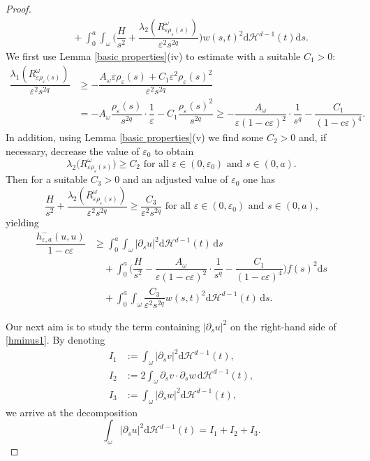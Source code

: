 \documentclass[10pt,a4paper]{amsart}
\newcommand{\dd}{\mathrm{d}}
\newcommand{\eps}{\varepsilon}
\renewcommand{\H}{\mathcal{H}}
\begin{document}
\begin{proof}
\begin{align*}
	&\quad+\int_0^a\int_\omega\bigg(\dfrac{H}{s^2}+\dfrac{\lambda_2(R^\omega_{\eps\rho_\eps(s)})}{\eps^2 s^{2q}}\bigg) w(s,t)^2\dd\H^{d-1}(t)\dd s.
\end{align*}
We first use Lemma \ref{basic properties}(iv) to estimate with a suitable $C_1>0$:
\begin{align*}
	\dfrac{\lambda_1(R^\omega_{\eps\rho_\eps(s)})}{\eps^2 s^{2q}}&
	\ge -\dfrac{A_\omega \eps\rho_\eps(s) +C_1\eps^2\rho_\eps(s)^2}{\eps^2s^{2q}}\\
	&=-A_\omega \dfrac{\rho_\eps(s)}{s^{2q}}\cdot\dfrac{1}{\eps}-C_1\dfrac{\rho_\eps(s)^2}{s^{2q}}\ge -\dfrac{A_\omega}{\eps(1-c\eps)^2}\cdot\dfrac{1}{s^q}-\dfrac{C_1}{(1-c\eps)^4}.
\end{align*}
In addition, using Lemma \ref{basic properties}(v) we find some $C_2>0$ and, if necessary, decrease the value of $\eps_0$ to obtain
\[
\lambda_2\big(R^\omega_{\eps\rho_\eps(s)}\big)\ge C_2\text{ for all $\eps\in(0,\eps_0)$ and $s\in(0,a)$.}
\]
Then for a suitable $C_3>0$ and an adjusted value of $\eps_0$ one has
\[
\dfrac{H}{s^2}+\dfrac{\lambda_2(R^\omega_{\eps\rho_\eps(s)})}{\eps^2 s^{2q}}\ge \dfrac{C_3}{\eps^2 s^{2q}}\text{ for all $\eps\in(0,\eps_0)$ and $s\in(0,a)$,}
\]
yielding
\begin{equation}
	\label{hminus1}
\begin{aligned}
	\dfrac{h^-_{\eps,a}(u,u)}{1-c\eps}&\ge \int_0^a\int_\omega |\partial_s u|^2\dd\H^{d-1}(t)\,\dd s\\
	&\quad+\int_0^a\bigg(\dfrac{H}{s^2}
	-\dfrac{A_\omega}{\eps(1-c\eps)^2}\cdot\dfrac{1}{s^q}-\dfrac{C_1}{(1-c\eps)^4}
	\bigg)f(s)^2\dd s\\
	&\quad+\int_0^a\int_\omega \dfrac{C_3}{\eps^2 s^{2q}}
	 w(s,t)^2\dd\H^{d-1}(t)\,\dd s.
\end{aligned}
\end{equation}

Our next aim is to study the term containing $|\partial_s u|^2$ on the right-hand side of \eqref{hminus1}. By denoting
\begin{align*}
	I_1&:=\int_\omega |\partial_s v|^2\dd\H^{d-1}(t),\\
	I_2&:=2\int_\omega \partial_s v\cdot\partial_s w \,\dd\H^{d-1}(t),\\
	I_3&:=\int_\omega |\partial_s w|^2\dd\H^{d-1}(t),
\end{align*}
we arrive at the decomposition
\begin{equation}
	\label{udecomp}
	\int_\omega |\partial_s u|^2\dd\H^{d-1}(t)=I_1+I_2+I_3.
\end{equation}


\end{proof}
\end{document}
